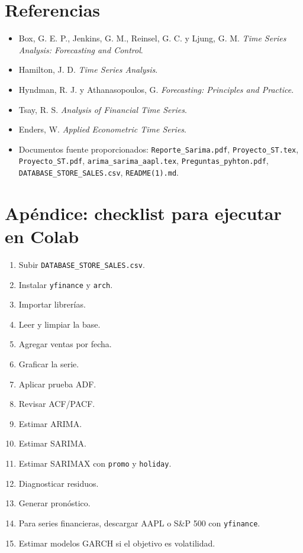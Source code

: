 \documentclass[12pt,a4paper]{article}
\begin{document}
\section{Referencias}

\begin{itemize}
    \item Box, G. E. P., Jenkins, G. M., Reinsel, G. C. y Ljung, G. M. \textit{Time Series Analysis: Forecasting and Control}.
    \item Hamilton, J. D. \textit{Time Series Analysis}.
    \item Hyndman, R. J. y Athanasopoulos, G. \textit{Forecasting: Principles and Practice}.
    \item Tsay, R. S. \textit{Analysis of Financial Time Series}.
    \item Enders, W. \textit{Applied Econometric Time Series}.
    \item Documentos fuente proporcionados: \texttt{Reporte\_Sarima.pdf}, \texttt{Proyecto\_ST.tex}, \texttt{Proyecto\_ST.pdf}, \texttt{arima\_sarima\_aapl.tex}, \texttt{Preguntas\_pyhton.pdf}, \texttt{DATABASE\_STORE\_SALES.csv}, \texttt{README(1).md}.
\end{itemize}

\appendix
\section{Apéndice: checklist para ejecutar en Colab}

\begin{enumerate}
    \item Subir \texttt{DATABASE\_STORE\_SALES.csv}.
    \item Instalar \texttt{yfinance} y \texttt{arch}.
    \item Importar librerías.
    \item Leer y limpiar la base.
    \item Agregar ventas por fecha.
    \item Graficar la serie.
    \item Aplicar prueba ADF.
    \item Revisar ACF/PACF.
    \item Estimar ARIMA.
    \item Estimar SARIMA.
    \item Estimar SARIMAX con \texttt{promo} y \texttt{holiday}.
    \item Diagnosticar residuos.
    \item Generar pronóstico.
    \item Para series financieras, descargar AAPL o S\&P 500 con \texttt{yfinance}.
    \item Estimar modelos GARCH si el objetivo es volatilidad.
\end{enumerate}
\end{document}
